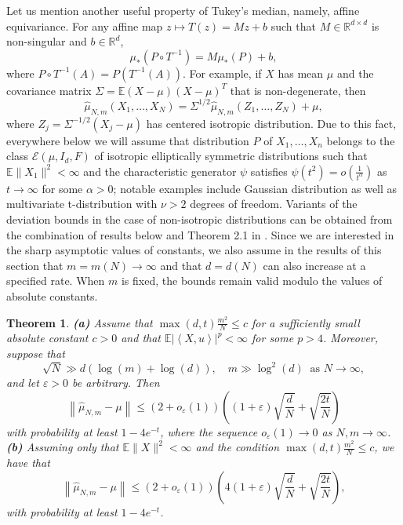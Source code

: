 \documentclass[12pt]{article}
\newcommand{\eps}{\varepsilon}
\newcommand{\wh}{\widehat}
\def\l{\left}
\def\r{\right}
\newcommand{\mb}{\mathbb}
\newcommand{\dotp}[2]{\left\langle#1,#2\right\rangle}
\newtheorem{theorem}{Theorem}%
\theoremstyle{thmstyletwo}%
\theoremstyle{thmstylethree}%
\begin{document}
Let us mention another useful property of Tukey's median, namely, affine equivariance. For any affine map $z\mapsto T(z) = Mz+b$ such that $M\in \mb R^{d\times d}$ is non-singular and $b\in \mb R^d$, 
\[
\mu_\ast(P\circ T^{-1}) = M \mu_\ast(P) + b,
\]
where $P\circ T^{-1}(A) = P\l( T^{-1}(A)\r)$. For example, if $X$ has mean $\mu$ and the covariance matrix $\Sigma = \mb E(X-\mu)(X-\mu)^T$ that is non-degenerate, then 
\[
\wh\mu_{N,m}(X_1,\ldots,X_N) = \Sigma^{1/2}\wh\mu_{N,m}(Z_1,\ldots,Z_N) + \mu, 
\]
where $Z_j = \Sigma^{-1/2}(X_j - \mu)$ has centered isotropic distribution. 
Due to this fact, everywhere below we will assume that distribution $P$ of $X_1,\ldots,X_n$ belongs to the class $\mathcal{E}(\mu, I_d, F)$ of isotropic elliptically symmetric distributions such that $\mb E\|X_1\|^2<\infty$ and the characteristic generator $\psi$ satisfies $\psi(t^2) = o\l(\frac{1}{t^\alpha}\r)$ as $t \rightarrow \infty$ for some $\alpha > 0$; notable examples include Gaussian distribution as well as multivariate t-distribution with $\nu>2$ degrees of freedom. Variants of the deviation bounds in the case of non-isotropic distributions can be obtained from the combination of results below and Theorem 2.1 in \citep{minsker2024improved}. Since we are interested in the sharp asymptotic values of constants, we also assume in the results of this section that $m=m(N)\to\infty$ and that $d=d(N)$ can also increase at a specified rate. When $m$ is fixed, the bounds remain valid modulo the values of absolute constants. 
\begin{theorem}
\label{th:tukey-nonasymp}
    \textbf{(a)} Assume that $\max(d,t)\frac{m^2}{N}\leq c$ for a sufficiently small absolute constant $c>0$ and that 
    $\mb E\l|\dotp{X}{u}\r|^p<\infty$ for some $p>4$. Moreover, suppose that 
    \[
    \sqrt N\gg d(\log(m)+\log(d)), \quad m\gg \log^2(d) \ \text{ as } N\to\infty,
    \]
    and let $\eps>0$ be arbitrary. Then
    \begin{equation}
        \label{eq:deviation-1}
    \l\|\wh\mu_{N,m} - \mu \r\| \leq (2 + o_\eps(1))\l((1+\eps)\sqrt{\frac{d}{N}} +
    \sqrt{\frac{2t}{N}}\r)
    \end{equation}
    with probability at least $1-4e^{-t}$, where the sequence $o_\eps(1)\to 0$ as $N,m\to\infty$. 
    \\
    \noindent \textbf{(b)} Assuming only that $\mb E\|X\|^2<\infty$ and the condition $\max(d,t)\frac{m^2}{N}\leq c$, we have that
    \begin{equation}
        \label{eq:deviation-2}
    \l\|\wh\mu_{N,m} - \mu \r\| \leq (2 + o_\eps(1)) \l(4(1+\eps)\sqrt{\frac{d}{N}} +
    \sqrt{\frac{2t}{N}} \r),
    \end{equation}
    with probability at least $1-4e^{-t}$. 
\end{theorem}
\end{document}
